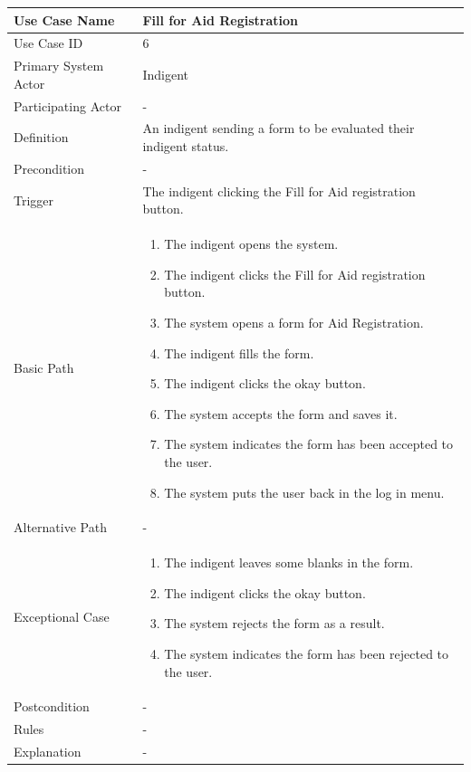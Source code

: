 \documentclass[a4paper,12pt]{report}
\begin{document}
		\begin{tabular}{|m{4cm}|m{11.5cm}|}
			\hline
				Use Case Name & Fill for Aid Registration\\
			\hline
				Use Case ID & 6\\
			\hline
				Primary System Actor & Indigent\\
			\hline
				Participating Actor & -\\
			\hline
				Definition & An indigent sending a form to be evaluated their indigent status.\\
			\hline
				Precondition & -\\
			\hline
				Trigger & The indigent clicking the Fill for Aid registration button.\\
			\hline
				Basic Path & \begin{enumerate}
					\item The indigent opens the system.
					\item The indigent clicks the Fill for Aid registration button.
					\item The system opens a form for Aid Registration.
					\item The indigent fills the form.
					\item The indigent clicks the okay button.
					\item The system accepts the form and saves it.
					\item The system indicates the form has been accepted to the user.
					\item The system puts the user back in the log in menu.
				\end{enumerate}		
				\\
			\hline
				Alternative Path & -\\
			\hline
				Exceptional Case & \begin{enumerate}
					\item The indigent leaves some blanks in the form.
					\item The indigent clicks the okay button.
					\item The system rejects the form as a result.
					\item The system indicates the form has been rejected to the user.
				\end{enumerate}
				\\
			\hline
				Postcondition & -\\
			\hline
				Rules & -\\
			\hline
				Explanation & -\\
			\hline
		\end{tabular}
\end{document}
